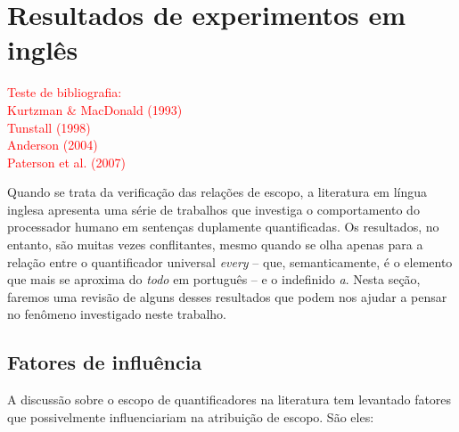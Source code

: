 \chapter{Resultados de experimentos em inglês}

\textcolor{red}{Teste de bibliografia:\\
Kurtzman \& MacDonald (1993)~\cite{KMac1993}~\cite{KMac1993}\\
Tunstall (1998)~\cite{Tunstall1998}~\cite{Tunstall1998}\\
Anderson (2004)~\cite{Anderson2004}~\cite{Anderson2004}\\
Paterson et al. (2007)~\cite{paterson2007}\\}

Quando se trata da verificação das relações de escopo, a literatura em língua inglesa apresenta uma série de trabalhos que investiga o comportamento do processador humano em sentenças duplamente quantificadas. Os resultados, no entanto, são muitas vezes conflitantes, mesmo quando se olha apenas para a relação entre o quantificador universal \emph{every} -- que, semanticamente, é o elemento que mais se aproxima do \emph{todo} em português -- e o indefinido \emph{a}. Nesta seção, faremos uma revisão de alguns desses resultados que podem nos ajudar a pensar no fenômeno investigado neste trabalho.

\section{Fatores de influência}
A discussão sobre o escopo de quantificadores na literatura tem levantado fatores que possivelmente influenciariam na atribuição de escopo. São eles:

